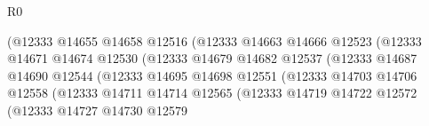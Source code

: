 \begin{lexlean}{R0}
\begin{coremodule}
                                                (@12333
                                                  @14655
                                                  @14658
                                                  @12516
                                                  (@12333
                                                    @14663
                                                    @14666
                                                    @12523
                                                    (@12333
                                                      @14671
                                                      @14674
                                                      @12530
                                                      (@12333
                                                        @14679
                                                        @14682
                                                        @12537
                                                        (@12333
                                                          @14687
                                                          @14690
                                                          @12544
                                                          (@12333
                                                            @14695
                                                            @14698
                                                            @12551
                                                            (@12333
                                                              @14703
                                                              @14706
                                                              @12558
                                                              (@12333
                                                                @14711
                                                                @14714
                                                                @12565
                                                                (@12333
                                                                  @14719
                                                                  @14722
                                                                  @12572
                                                                  (@12333
                                                                    @14727
                                                                    @14730
                                                                    @12579

\end{coremodule}
\end{lexlean}
